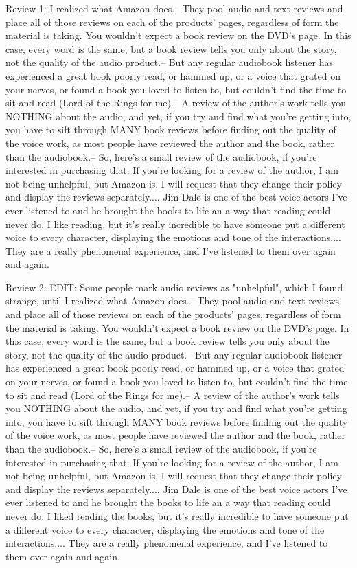 \documentclass[12pt, a4paper[]{article}
\begin{document}
\dotfill
\begin{itemize}
    {\fontsize{9pt}{11pt}\selectfont
    \item Review 1: I realized what Amazon does.-- They pool audio and text reviews and place all of those reviews on each of the products' pages, regardless of form the material is taking. You wouldn't expect a book review on the DVD's page. In this case, every word is the same, but a book review tells you only about the story, not the quality of the audio product.-- But any regular audiobook listener has experienced a great book poorly read, or hammed up, or a voice that grated on your nerves, or found a book you loved to listen to, but couldn't find the time to sit and read (Lord of the Rings for me).-- A review of the author's work tells you NOTHING about the audio, and yet, if you try and find what you're getting into, you have to sift through MANY book reviews before finding out the quality of the voice work, as most people have reviewed the author and the book, rather than the audiobook.-- So, here's a small review of the audiobook, if you're interested in purchasing that. If you're looking for a review of the author, I am not being unhelpful, but Amazon is. I will request that they change their policy and display the reviews separately.... Jim Dale is one of the best voice actors I've ever listened to and he brought the books to life an a way that reading could never do. I like reading, but it's really incredible to have someone put a different voice to every character, displaying the emotions and tone of the interactions.... They are a really phenomenal experience, and I've listened to them over again and again.
    \item Review 2: EDIT: Some people mark audio reviews as "unhelpful", which I found strange, until I realized what Amazon does.-- They pool audio and text reviews and place all of those reviews on each of the products' pages, regardless of form the material is taking. You wouldn't expect a book review on the DVD's page. In this case, every word is the same, but a book review tells you only about the story, not the quality of the audio product.-- But any regular audiobook listener has experienced a great book poorly read, or hammed up, or a voice that grated on your nerves, or found a book you loved to listen to, but couldn't find the time to sit and read (Lord of the Rings for me).-- A review of the author's work tells you NOTHING about the audio, and yet, if you try and find what you're getting into, you have to sift through MANY book reviews before finding out the quality of the voice work, as most people have reviewed the author and the book, rather than the audiobook.-- So, here's a small review of the audiobook, if you're interested in purchasing that. If you're looking for a review of the author, I am not being unhelpful, but Amazon is. I will request that they change their policy and display the reviews separately.... Jim Dale is one of the best voice actors I've ever listened to and he brought the books to life an a way that reading could never do. I liked reading the books, but it's really incredible to have someone put a different voice to every character, displaying the emotions and tone of the interactions.... They are a really phenomenal experience, and I've listened to them over again and again.
}
\end{itemize}
\end{document}
